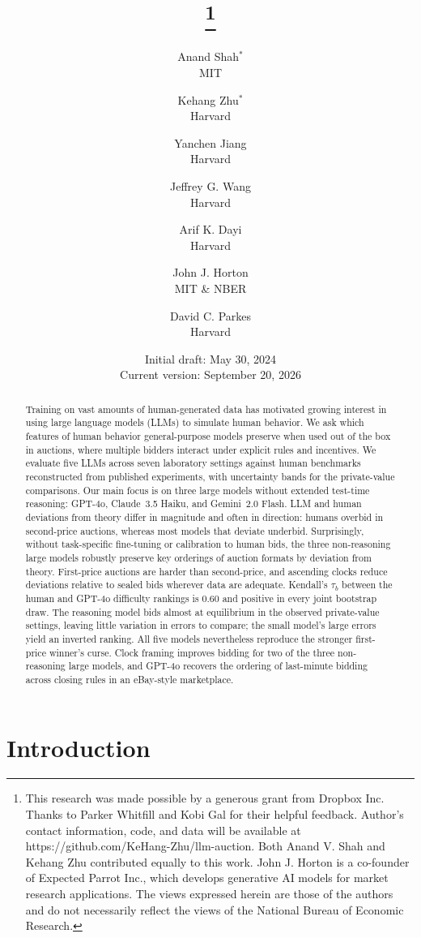 \documentclass{article} %
\title{\vspace*{-1cm} \rev{LLM Bidders Preserve the Mechanism-Level Orderings of Human Bidders} \thanks{
  \footnotesize
This research was made possible by a generous grant from Dropbox Inc. Thanks to Parker Whitfill and Kobi Gal for their helpful feedback. Author's contact information, code, and data will be available at https://github.com/KeHang-Zhu/llm-auction. Both Anand V. Shah and Kehang Zhu contributed equally to this work. John J. Horton is a co-founder of Expected Parrot Inc., which develops generative AI models for market research applications. The views expressed herein are those of the authors and do not necessarily reflect the views of the National Bureau of Economic Research.
}
}
\author{
  Anand Shah$^{*}$\\
  MIT \\
  \and
  Kehang Zhu$^{*}$\\
  Harvard  \\
  \and
  Yanchen Jiang \\
  Harvard \\
  \and
  Jeffrey G. Wang \\
  Harvard \\
  \and
  Arif K. Dayi \\
  Harvard \\
  \and
  John J. Horton \\
  MIT \& NBER \\
  \and
  David C. Parkes \\
  Harvard \\
}
\date{
Initial draft: May 30, 2024 \\
Current version: September 20, 2026
}
\newif\ifmarkrev
\newcommand{\rev}[1]{\ifmarkrev\begingroup\color{red}#1\endgroup\else#1\fi}
\begin{document}
\maketitle
\begin{abstract}
\rev{Training on vast amounts of human-generated data has motivated growing interest in using large language models (LLMs) to simulate human behavior. We ask which features of human behavior general-purpose models preserve when used out of the box in auctions, where multiple bidders interact under explicit rules and incentives. We evaluate five LLMs across seven laboratory settings against human benchmarks reconstructed from published experiments, with uncertainty bands for the private-value comparisons. Our main focus is on three large models without extended test-time reasoning: GPT-4o, Claude~3.5 Haiku, and Gemini~2.0 Flash. LLM and human deviations from theory differ in magnitude and often in direction: humans overbid in second-price auctions, whereas most models that deviate underbid. Surprisingly, without task-specific fine-tuning or calibration to human bids, the three non-reasoning large models robustly preserve key orderings of auction formats by deviation from theory. First-price auctions are harder than second-price, and ascending clocks reduce deviations relative to sealed bids wherever data are adequate. Kendall's $\tau_b$ between the human and GPT-4o difficulty rankings is $0.60$ and positive in every joint bootstrap draw. The reasoning model bids almost at equilibrium in the observed private-value settings, leaving little variation in errors to compare; the small model's large errors yield an inverted ranking. All five models nevertheless reproduce the stronger first-price winner's curse. Clock framing improves bidding for two of the three non-reasoning large models, and GPT-4o recovers the ordering of last-minute bidding across closing rules in an eBay-style marketplace.}
\end{abstract}








\newpage
\section{Introduction} \label{sec:introduction}
\end{document}
